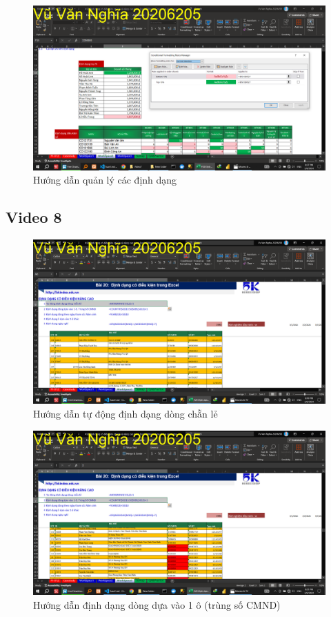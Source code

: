 \documentclass{article}
\begin{document}
\begin{figure}[H]
\centering
\includegraphics[scale = 0.15]{Video7/HuongDan/7.png}
\caption{Hướng dẫn quản lý các định dạng}
\end{figure}
\subsection{Video 8}
\begin{figure}[H]
\centering
\includegraphics[scale = 0.15]{Video8/HuongDan/0.png}
\caption{Hướng dẫn tự động định dạng dòng chẵn lẻ}
\end{figure}

\begin{figure}[H]
\centering
\includegraphics[scale = 0.15]{Video8/HuongDan/1.png}
\caption{Hướng dẫn định dạng dòng dựa vào 1 ô (trùng số CMND)}
\end{figure}
\end{document}
